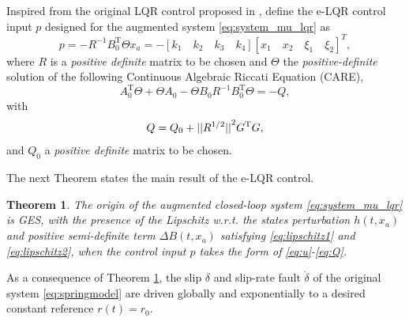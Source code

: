 \documentclass[journal,twoside,web]{ieeecolor}
\newtheorem{theorem}{Theorem}
\begin{document}
Inspired from the original LQR control proposed in \cite{b:Kalman-1960}, define the e-LQR control input $p$ designed for the augmented system \eqref{eq:system_mu_lqr} as
\begin{equation}
\displaystyle
p = -R^{-1}B_0^{\text{T}} \Theta x_a = -[k_1 \quad k_2 \quad k_3 \quad k_4][x_1 \quad x_2 \quad \xi_1 \quad \xi_2]^T,
\label{eq:u}
\end{equation}
where $R$ is a \textit{positive definite} matrix to be chosen and $\Theta$ the \textit{positive-definite} solution of the following Continuous Algebraic Riccati Equation (CARE),
\begin{equation}
\displaystyle
A_0^{\text{T}} \Theta + \Theta A_0 - \Theta B_0 R^{-1} B_0^{\text{T}} \Theta = -Q,
\label{eq:CARE}
\end{equation}
with
\begin{equation}
\displaystyle
Q = Q_0 + ||R^{1/2}||\strut^2 G^{\text{T}} G ,
\label{eq:Q}
\end{equation}
and $Q_0$ a \textit{positive definite} matrix to be chosen. 

The next Theorem states the main result of the e-LQR control.

\begin{theorem}
The origin of the augmented closed-loop system \eqref{eq:system_mu_lqr} is GES, with the presence of the Lipschitz w.r.t. the states perturbation $h(t,x_a)$ and positive semi-definite term $\Delta B(t,x_a)$ satisfying \eqref{eq:lipschitz1} and \eqref{eq:lipschitz2}, when the control input $p$ takes the form of \eqref{eq:u}-\eqref{eq:Q}.
\label{th:eLQR}
\end{theorem}

As a consequence of Theorem \ref{th:eLQR}, the slip $\delta$ and slip-rate fault $\dot{\delta}$ of the original system \eqref{eq:springmodel} are driven globally and exponentially to a desired constant reference $r(t)=r_0$.
\end{document}
